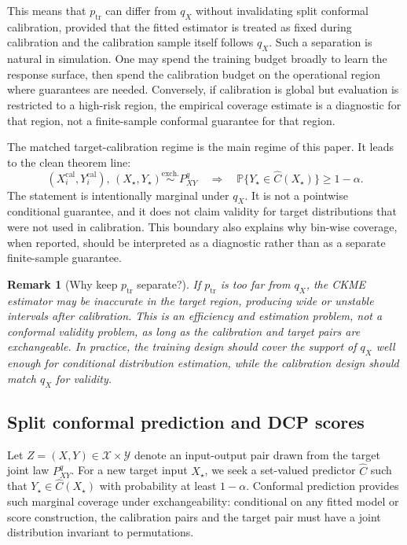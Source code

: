 \documentclass[11pt]{article}
\newtheorem{remark}{Remark}
\newcommand{\Xcal}{\mathcal X}
\newcommand{\Ycal}{\mathcal Y}
\newcommand{\Pp}{\mathbb P}
\begin{document}
This means that \(p_{\mathrm{tr}}\) can differ from \(q_X\) without invalidating split conformal calibration, provided that the fitted estimator is treated as fixed during calibration and the calibration sample itself follows \(q_X\). Such a separation is natural in simulation. One may spend the training budget broadly to learn the response surface, then spend the calibration budget on the operational region where guarantees are needed. Conversely, if calibration is global but evaluation is restricted to a high-risk region, the empirical coverage estimate is a diagnostic for that region, not a finite-sample conformal guarantee for that region.

The matched target-calibration regime is the main regime of this paper. It leads to the clean theorem line:
\[
  (X_i^{\mathrm{cal}},Y_i^{\mathrm{cal}}),\,(X_\star,Y_\star)
  \stackrel{\mathrm{exch.}}{\sim} P^q_{XY}
  \quad\Longrightarrow\quad
  \Pp\{Y_\star\in\widehat C(X_\star)\}\ge 1-\alpha .
\]
The statement is intentionally marginal under \(q_X\). It is not a pointwise conditional guarantee, and it does not claim validity for target distributions that were not used in calibration. This boundary also explains why bin-wise coverage, when reported, should be interpreted as a diagnostic rather than as a separate finite-sample guarantee.

\begin{remark}[Why keep \(p_{\mathrm{tr}}\) separate?]
If \(p_{\mathrm{tr}}\) is too far from \(q_X\), the CKME estimator may be inaccurate in the target region, producing wide or unstable intervals after calibration. This is an efficiency and estimation problem, not a conformal validity problem, as long as the calibration and target pairs are exchangeable. In practice, the training design should cover the support of \(q_X\) well enough for conditional distribution estimation, while the calibration design should match \(q_X\) for validity.
\end{remark}

\subsection{Split conformal prediction and DCP scores}

Let \(Z=(X,Y)\in\Xcal\times\Ycal\) denote an input-output pair drawn from the target joint law \(P^q_{XY}\). For a new target input \(X_\star\), we seek a set-valued predictor \(\widehat C\) such that \(Y_\star\in\widehat C(X_\star)\) with probability at least \(1-\alpha\). Conformal prediction provides such marginal coverage under exchangeability: conditional on any fitted model or score construction, the calibration pairs and the target pair must have a joint distribution invariant to permutations.
\end{document}
